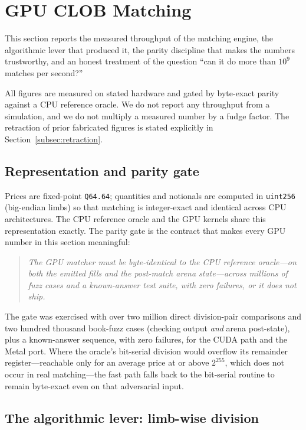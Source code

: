 \section{GPU CLOB Matching}
\label{sec:gpu-matching}

This section reports the measured throughput of the matching engine, the algorithmic lever
that produced it, the parity discipline that makes the numbers trustworthy, and an honest
treatment of the question ``can it do more than $10^{9}$ matches per second?''

All figures are measured on stated hardware and gated by byte-exact parity against a CPU
reference oracle. We do not report any throughput from a simulation, and we do not multiply
a measured number by a fudge factor. The retraction of prior fabricated figures is stated
explicitly in Section~\ref{subsec:retraction}.

\subsection{Representation and parity gate}

Prices are fixed-point \texttt{Q64.64}; quantities and notionals are computed in
\texttt{uint256} (big-endian limbs) so that matching is integer-exact and identical across
CPU architectures. The CPU reference oracle and the GPU kernels share this representation
exactly. The parity gate is the contract that makes every GPU number in this section
meaningful:

\begin{quote}
\emph{The GPU matcher must be byte-identical to the CPU reference oracle---on both the
emitted fills and the post-match arena state---across millions of fuzz cases and a
known-answer test suite, with zero failures, or it does not ship.}
\end{quote}

The gate was exercised with over two million direct division-pair comparisons and two
hundred thousand book-fuzz cases (checking output \emph{and} arena post-state), plus a
known-answer sequence, with zero failures, for the CUDA path and the Metal port. Where the
oracle's bit-serial division would overflow its remainder register---reachable only for an
average price at or above $2^{255}$, which does not occur in real matching---the fast path
falls back to the bit-serial routine to remain byte-exact even on that adversarial input.

\subsection{The algorithmic lever: limb-wise division}

